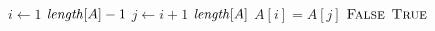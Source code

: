 \begin{codebox}
\li \For $i \gets 1$ \To $\id{length}[A]-1$
\li \Do
      \For $j \gets i+1$ \To $\id{length}[A]$
\li   \Do
        \If $A[i] = A[j]$
\li     \Then
          \Return $\textnormal{\scshape False}$
        \End    
      \End    
    \End    
\li \Return $\textnormal{\scshape True}$
\end{codebox}

